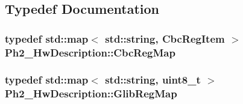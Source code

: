 \subsection{Typedef Documentation}
\hypertarget{namespace_ph2___hw_description_a9a23b373068f169aa67ca1d22c9a6001}{
\subsubsection[{Cbc\-Reg\-Map}]{\setlength{\rightskip}{0pt plus 5cm}typedef std\-::map$<$ std\-::string, {\bf Cbc\-Reg\-Item} $>$ {\bf Ph2\-\_\-\-Hw\-Description\-::\-Cbc\-Reg\-Map}}}\label{namespace_ph2___hw_description_a9a23b373068f169aa67ca1d22c9a6001}
\hypertarget{namespace_ph2___hw_description_afc0e75a92548c3406e89bf39ca4c9bfb}{
\subsubsection[{Glib\-Reg\-Map}]{\setlength{\rightskip}{0pt plus 5cm}typedef std\-::map$<$ std\-::string, uint8\-\_\-t $>$ {\bf Ph2\-\_\-\-Hw\-Description\-::\-Glib\-Reg\-Map}}}\label{namespace_ph2___hw_description_afc0e75a92548c3406e89bf39ca4c9bfb}


